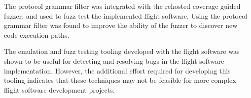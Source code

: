 \documentclass[../report.tex]{subfiles}
\begin{document}
The protocol grammar filter was integrated with the rehosted coverage guided
fuzzer, and used to fuzz test the implemented flight software. Using the
protocol grammar filter was found to improve the ability of the fuzzer to
discover new code execution paths.

The emulation and fuzz testing tooling developed with the flight software was
shown to be useful for detecting and resolving bugs in the flight software
implementation. However, the additional effort required for developing this
tooling indicates that these techniques may not be feasible for more complex
flight software development projects.
\end{document}
